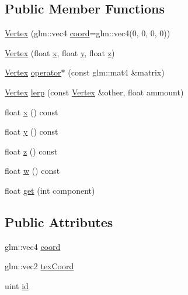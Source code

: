 \subsection*{Public Member Functions}
\begin{DoxyCompactItemize}
\item 
\hyperlink{struct_vertex_a314b0e4370b7b33efdaa4bf492b91021}{Vertex} (glm\+::vec4 \hyperlink{struct_vertex_aabc10e3b8e0171bcbe77b014944271b3}{coord}=glm\+::vec4(0, 0, 0, 0))
\item 
\hyperlink{struct_vertex_a2c558c054a0a2c970588c063073803a0}{Vertex} (float \hyperlink{struct_vertex_a5aeac850629b2391834b1ea862cd3165}{x}, float \hyperlink{struct_vertex_ab7cbabc42312a9494a6889a0106889a2}{y}, float \hyperlink{struct_vertex_ad643c72d7d0edb4763fa5de716e17228}{z})
\item 
\hyperlink{struct_vertex}{Vertex} \hyperlink{struct_vertex_a7b6c5132e8fd35a45481d8ba1e96d981}{operator$\ast$} (const glm\+::mat4 \&matrix)
\item 
\hyperlink{struct_vertex}{Vertex} \hyperlink{struct_vertex_ae3ede62e3d8f7614bead7becbeed065e}{lerp} (const \hyperlink{struct_vertex}{Vertex} \&other, float ammount)
\item 
float \hyperlink{struct_vertex_a5aeac850629b2391834b1ea862cd3165}{x} () const 
\item 
float \hyperlink{struct_vertex_ab7cbabc42312a9494a6889a0106889a2}{y} () const 
\item 
float \hyperlink{struct_vertex_ad643c72d7d0edb4763fa5de716e17228}{z} () const 
\item 
float \hyperlink{struct_vertex_a3b549b8c60d7530358e941a390196c54}{w} () const 
\item 
float \hyperlink{struct_vertex_a9859cbbdd117fb2b59f56966f8a93e6e}{get} (int component)
\end{DoxyCompactItemize}
\subsection*{Public Attributes}
\begin{DoxyCompactItemize}
\item 
glm\+::vec4 \hyperlink{struct_vertex_aabc10e3b8e0171bcbe77b014944271b3}{coord}
\item 
glm\+::vec2 \hyperlink{struct_vertex_a8214ff52fee03a5524ce58c3810a1be9}{tex\+Coord}
\item 
uint \hyperlink{struct_vertex_aee423a6a530f42da4d6a9b306fc348e7}{id}
\end{DoxyCompactItemize}


